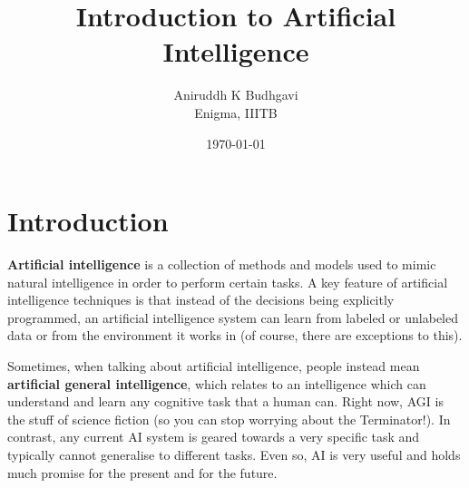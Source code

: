\documentclass{article}
\title{Introduction to Artificial Intelligence}
\date{\today}
\author{Aniruddh K Budhgavi \\ Enigma, IIITB}
\begin{document}
    \maketitle

    \section{Introduction}
        \textbf{Artificial intelligence} is a collection of methods and models
        used to mimic natural intelligence in order to perform certain tasks.
        A key feature of artificial intelligence techniques is that instead of
        the decisions being explicitly programmed, an artificial intelligence 
        system can learn from labeled or unlabeled data or from the 
        environment it works in (of course, there are exceptions to this).

        Sometimes, when talking about artificial intelligence, people instead mean
        \textbf{artificial general intelligence}, which relates to an intelligence
        which can understand and learn any cognitive task that a human can.
        Right now, AGI is the stuff of science fiction (so you can stop worrying
        about the Terminator!). In contrast, any current AI system is geared towards
        a very specific task and typically cannot generalise to different tasks.
        Even so, AI is very useful and holds much promise for 
        the present and for the future.
\end{document}
